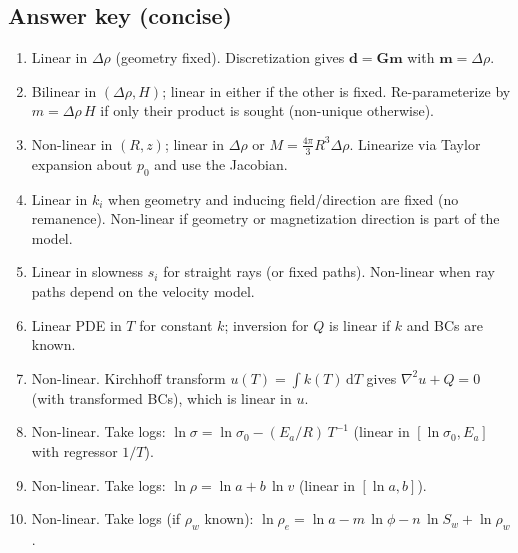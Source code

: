 \subsection*{Answer key (concise)}
\begin{enumerate}[label=A\arabic*.,itemsep=6pt]
  \item Linear in $\Delta\rho$ (geometry fixed). Discretization gives $\mathbf{d}=\mathbf{G}\mathbf{m}$ with $\mathbf{m}=\Delta\rho$.
  \item Bilinear in $(\Delta\rho,H)$; linear in either if the other is fixed. Re-parameterize by $m=\Delta\rho\,H$ if only their product is sought (non-unique otherwise).
  \item Non-linear in $(R,z)$; linear in $\Delta\rho$ or $M=\tfrac{4\pi}{3}R^3\Delta\rho$. Linearize via Taylor expansion about $p_0$ and use the Jacobian.
  \item Linear in $k_i$ when geometry and inducing field/direction are fixed (no remanence). Non-linear if geometry or magnetization direction is part of the model.
  \item Linear in slowness $s_i$ for straight rays (or fixed paths). Non-linear when ray paths depend on the velocity model.
  \item Linear PDE in $T$ for constant $k$; inversion for $Q$ is linear if $k$ and BCs are known.
  \item Non-linear. Kirchhoff transform $u(T)=\int k(T)\,\mathrm{d}T$ gives $\nabla^2 u + Q=0$ (with transformed BCs), which is linear in $u$.
  \item Non-linear. Take logs: $\ln\sigma = \ln\sigma_0 - (E_a/R)\,T^{-1}$ (linear in $[\ln\sigma_0, E_a]$ with regressor $1/T$).
  \item Non-linear. Take logs: $\ln\rho = \ln a + b\,\ln v$ (linear in $[\ln a, b]$).
  \item Non-linear. Take logs (if $\rho_w$ known): $\ln\rho_e = \ln a - m\,\ln\phi - n\,\ln S_w + \ln\rho_w$.
\end{enumerate}
